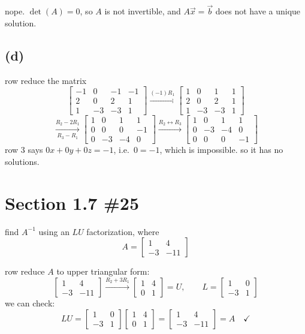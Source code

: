 \documentclass[12pt]{article}
\begin{document}
nope. $\det(A) = 0$, so $A$ is not invertible, and $A\vec{x} = \vec{b}$ does not have a unique solution.

\subsection*{(d)}

row reduce the matrix
\[
\left[\begin{array}{rrr|r}
-1 & 0 & -1 & -1 \\
2 & 0 & 2 & 1 \\
1 & -3 & -3 & 1
\end{array}\right]
\xrightarrow{(-1)R_1}
\left[\begin{array}{rrr|r}
1 & 0 & 1 & 1 \\
2 & 0 & 2 & 1 \\
1 & -3 & -3 & 1
\end{array}\right]
\]
\[
\xrightarrow[R_3 - R_1]{R_2 - 2R_1}
\left[\begin{array}{rrr|r}
1 & 0 & 1 & 1 \\
0 & 0 & 0 & -1 \\
0 & -3 & -4 & 0
\end{array}\right]
\xrightarrow{R_2 \leftrightarrow R_3}
\left[\begin{array}{rrr|r}
1 & 0 & 1 & 1 \\
0 & -3 & -4 & 0 \\
0 & 0 & 0 & -1
\end{array}\right]
\]
row 3 says $0x + 0y + 0z = -1$, i.e.\ $0 = -1$, which is impossible. so it has no solutions.

\section*{Section 1.7 \#25}

find $A^{-1}$ using an $LU$ factorization, where
\[
A = \begin{bmatrix} 1 & 4 \\ -3 & -11 \end{bmatrix}
\]

row reduce $A$ to upper triangular form:
\[
\begin{bmatrix} 1 & 4 \\ -3 & -11 \end{bmatrix}
\xrightarrow{R_2 + 3R_1}
\begin{bmatrix} 1 & 4 \\ 0 & 1 \end{bmatrix} = U,
\qquad
L = \begin{bmatrix} 1 & 0 \\ -3 & 1 \end{bmatrix}
\]
we can check:
\[
LU = \begin{bmatrix} 1 & 0 \\ -3 & 1 \end{bmatrix}\begin{bmatrix} 1 & 4 \\ 0 & 1 \end{bmatrix}
= \begin{bmatrix} 1 & 4 \\ -3 & -11 \end{bmatrix} = A \quad \checkmark
\]
\end{document}
